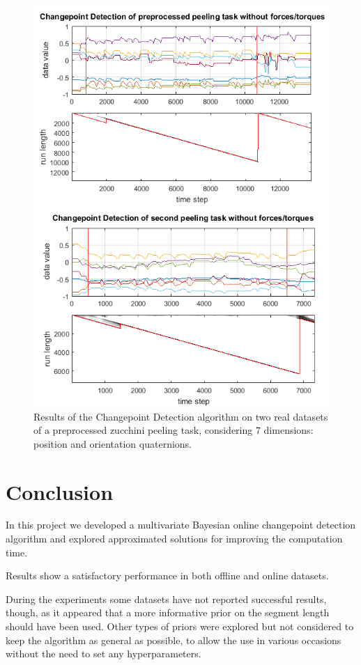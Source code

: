 \documentclass[11pt,twoside,a4paper]{report}
\begin{document}
\begin{figure} [ht]
\begin{minipage}{\textwidth}
\centering
\includegraphics[width=.7\textwidth]{proc1_7dim.png}
\end{minipage}
\begin{minipage}{\textwidth}
\centering
\includegraphics[width=.7\textwidth]{proc2_7dim.png}
\end{minipage}
\caption{Results of the Changepoint Detection algorithm on two real datasets of a preprocessed zucchini peeling task, considering 7 dimensions: position and orientation quaternions.}
\label{fig:peel7}
\end{figure}


\chapter{Conclusion}

In this project we developed a multivariate Bayesian online changepoint detection algorithm and explored approximated solutions for improving the computation time. 

Results show a satisfactory performance in both offline and online datasets.

During the experiments some datasets have not reported successful results, though, as it appeared that a more informative prior on the segment length should have been used. Other types of priors were explored but not considered to keep the algorithm as general as possible, to allow the use in various occasions without the need to set any hyperparameters.
\end{document}
